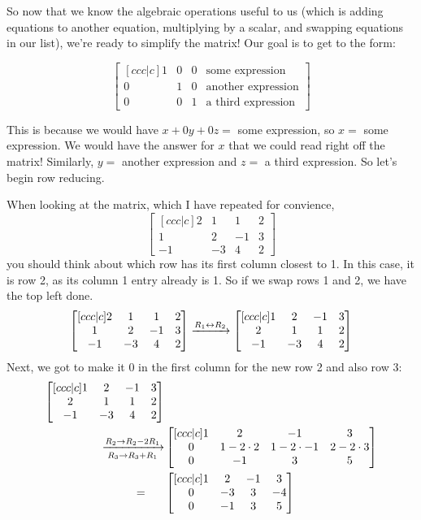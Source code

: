 \documentclass[12pt]{scrartcl}
\begin{document}
So now that we know the algebraic operations useful to us (which is adding equations to another equation, multiplying by a scalar, and swapping equations in our list), we're ready to simplify the matrix! Our goal is to get to the form:

\newpage
\[\begin{bmatrix}[ccc|c]
    1 & 0 & 0 & \text{some expression} \\
    0 & 1 & 0 & \text{another expression} \\
    0 & 0 & 1 & \text{a third expression}
\end{bmatrix}\]

This is because we would have $x + 0y + 0z =$ some expression, so $x =$ some expression. We would have the answer for $x$ that we could read right off the matrix! Similarly, $y =$ another expression and $z =$ a third expression. So let's begin row reducing.

When looking at the matrix, which I have repeated for convience,
\[\begin{bmatrix}[ccc|c]
    2 & 1 & 1 & 2 \\
    1 & 2 & -1 & 3 \\
    -1 & -3 & 4 & 2
\end{bmatrix}\]
you should think about which row has its first column closest to 1. In this case, it is row 2, as its column 1 entry already is 1. So if we swap rows 1 and 2, we have the top left done.
\[
    \begin{bmatrix}[ccc|c]
        2 & 1 & 1 & 2 \\
        1 & 2 & -1 & 3 \\
        -1 & -3 & 4 & 2
    \end{bmatrix}
    \xto[R_1 \lrto R_2]
    \begin{bmatrix}[ccc|c]
        1 & 2 & -1 & 3 \\
        2 & 1 & 1 & 2 \\
        -1 & -3 & 4 & 2
    \end{bmatrix}
\]
Next, we got to make it 0 in the first column for the new row 2 and also row 3:
\begin{align*}
    \begin{bmatrix}[ccc|c]
        1 & 2 & -1 & 3 \\
        2 & 1 & 1 & 2 \\
        -1 & -3 & 4 & 2
    \end{bmatrix}&\\
    \xto[R_2 \to R_2 - 2R_1][R_3 \to R_3 + R_1]&
    \begin{bmatrix}[ccc|c]
        1 & 2 & -1 & 3 \\
        0 & 1 - 2 \cdot 2 & 1 - 2 \cdot -1 & 2 - 2 \cdot 3 \\
        0 & -1 & 3 & 5
    \end{bmatrix} \\
    =\quad\:\:\: &
    \begin{bmatrix}[ccc|c]
        1 & 2 & -1 & 3 \\
        0 & -3 & 3 & -4 \\
        0 & -1 & 3 & 5
    \end{bmatrix}
\end{align*}
\end{document}
